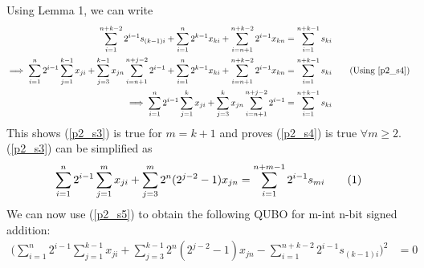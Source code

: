 \documentclass[12pt]{article}
\newcommand\numberthis{\addtocounter{equation}{1}\tag{\theequation}}
\begin{document}
Using Lemma 1, we can write
\begin{align*}
    \sum_{i=1}^{n+k-2}2^{i-1}s_{(k-1)i} + \sum_{i=1}^n2^{k-1}x_{ki} + \sum_{i=n+1}^{n+k-2}2^{i-1}x_{kn} &= \sum_{i=1}^{n+k-1}s_{ki}\\
    \implies \sum_{i=1}^{n}2^{i-1}\sum_{j=1}^{k-1}x_{ji} + \sum_{j=3}^{k-1}x_{jn}\sum_{i=n+1}^{n+j-2}2^{i-1} + \sum_{i=1}^n2^{k-1}x_{ki} + \sum_{i=n+1}^{n+k-2}2^{i-1}x_{kn} &= \sum_{i=1}^{n+k-1}s_{ki} \tag{Using \ref{p2_s4}}\\
    \implies \sum_{i=1}^{n}2^{i-1}\sum_{j=1}^{k}x_{ji} + \sum_{j=3}^{k}x_{jn}\sum_{i=n+1}^{n+j-2}2^{i-1} &= \sum_{i=1}^{n+k-1}s_{ki} 
\end{align*}
This shows (\ref{p2_s3}) is true for $m=k+1$ and proves (\ref{p2_s4}) is true $\forall m\geq2.$\\
(\ref{p2_s3}) can be simplified as 
\begin{align*}
    \sum_{i=1}^{n}2^{i-1}\sum_{j=1}^{m}x_{ji} + \sum_{j=3}^{m}2^n(2^{j-2}-1)x_{jn}
    = \sum_{i=1}^{n+m-1}2^{i-1}s_{mi} \numberthis{} \label{p2_s5}
\end{align*}
We can now use (\ref{p2_s5}) to obtain the following QUBO for m-int n-bit signed addition:
\begin{align*}
    \bigg(\sum_{i=1}^{n}2^{i-1}\sum_{j=1}^{k-1}x_{ji} + \sum_{j=3}^{k-1}2^n(2^{j-2}-1)x_{jn}
    - \sum_{i=1}^{n+k-2}2^{i-1}s_{(k-1)i}\bigg)^2 &= 0
\end{align*}
\end{document}
